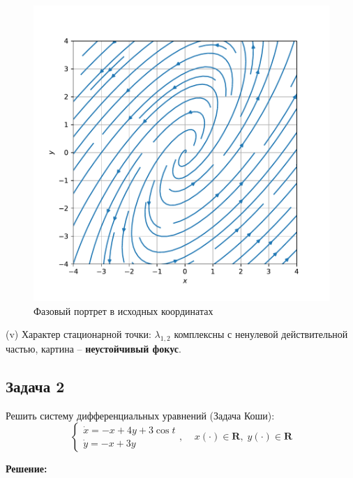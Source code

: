 \documentclass[a4paper, 12pt]{article}
\begin{document}
\begin{figure}[H]
	\centering
	\includegraphics[scale=0.8]{2a1_1}
	\caption{Фазовый портрет в исходных координатах}
	\label{im:2a1_1}
\end{figure}

(v) Характер стационарной точки: $\lambda_{1,2}$ комплексны с ненулевой действительной частью, картина -- \textbf{неустойчивый фокус}.

	\subsection {Задача 2}
 Решить систему дифференциальных уравнений (Задача Коши): 
\begin{equation}
\left\{
\begin{array}{lr}
\dot{x} = -x+4y+3\cos{t}\\
\dot{y} = -x+3y
\end{array}
\right.
, \;\;\;\; x(\cdot)\in \textbf{R},\; y(\cdot)\in \textbf{R}
\label{eq:9}
\end{equation}

\textbf{Решение:} \par
\end{document}
